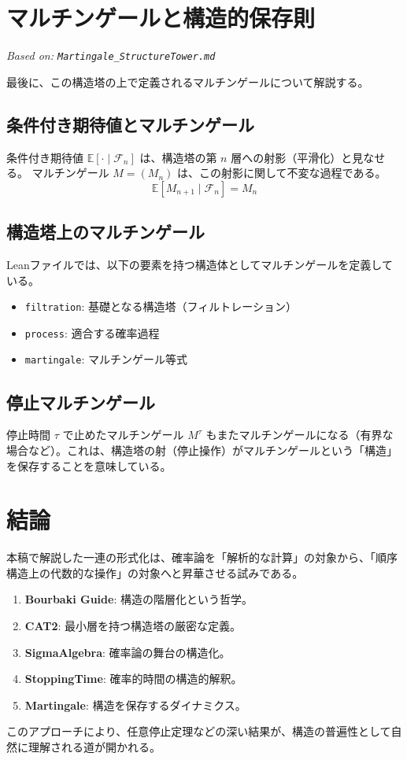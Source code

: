 \documentclass[a4paper,11pt]{ltjsarticle}
\theoremstyle{definition}
\newcommand{\F}{\mathcal{F}}
\newcommand{\Expect}{\mathbb{E}}
\newcommand{\Tau}{\tau}
\newcommand{\CondExp}[2]{\Expect[#1 \mid #2]}
\begin{document}
\section{マルチンゲールと構造的保存則}
\label{sec:martingale}
\textit{Based on: \texttt{Martingale\_StructureTower.md}}

最後に、この構造塔の上で定義されるマルチンゲールについて解説する。

\subsection{条件付き期待値とマルチンゲール}
条件付き期待値 $\CondExp{\cdot}{\F_n}$ は、構造塔の第 $n$ 層への射影（平滑化）と見なせる。
マルチンゲール $M = (M_n)$ は、この射影に関して不変な過程である。
\[ \CondExp{M_{n+1}}{\F_n} = M_n \]

\subsection{構造塔上のマルチンゲール}
Leanファイルでは、以下の要素を持つ構造体としてマルチンゲールを定義している。
\begin{itemize}
    \item \texttt{filtration}: 基礎となる構造塔（フィルトレーション）
    \item \texttt{process}: 適合する確率過程
    \item \texttt{martingale}: マルチンゲール等式
\end{itemize}

\subsection{停止マルチンゲール}
停止時間 $\Tau$ で止めたマルチンゲール $M^\Tau$ もまたマルチンゲールになる（有界な場合など）。これは、構造塔の射（停止操作）がマルチンゲールという「構造」を保存することを意味している。

\section{結論}
本稿で解説した一連の形式化は、確率論を「解析的な計算」の対象から、「順序構造上の代数的な操作」の対象へと昇華させる試みである。
\begin{enumerate}
    \item \textbf{Bourbaki Guide}: 構造の階層化という哲学。
    \item \textbf{CAT2}: 最小層を持つ構造塔の厳密な定義。
    \item \textbf{SigmaAlgebra}: 確率論の舞台の構造化。
    \item \textbf{StoppingTime}: 確率的時間の構造的解釈。
    \item \textbf{Martingale}: 構造を保存するダイナミクス。
\end{enumerate}
このアプローチにより、任意停止定理などの深い結果が、構造の普遍性として自然に理解される道が開かれる。
\end{document}
